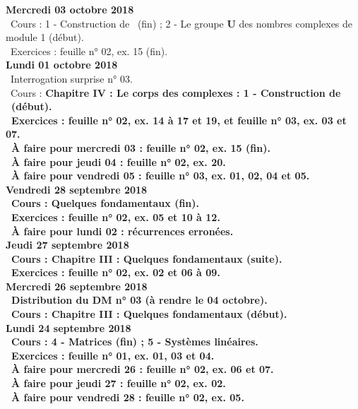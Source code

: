 \documentclass[12pt,a4paper]{article}
\begin{document}
\noindent\textbf{\bf Mercredi 03 octobre 2018}\\
\bu\ Cours : 1 - Construction de \C\ (fin) ; 2 - Le groupe \textbf{U} des nombres 
complexes de module 1 (début).\\
\bu\ Exercices : feuille n° 02, ex. 15 (fin).\vspace{.4cm}\\

\noindent\textbf{\bf Lundi 01 octobre 2018}\\
\bu\ Interrogation surprise n° 03.\\
\bu\ Cours : \bf Chapitre IV \rm : Le corps des complexes : 1 - Construction de \C\ (début).\\
\bu\ Exercices : feuille n° 02, ex. 14 à 17 et 19, et feuille n° 03, ex. 03 et 07.\\
\bu\ À faire pour mercredi 03 : feuille n° 02, ex. 15 (fin).\\
\bu\ À faire pour jeudi 04 : feuille n° 02, ex. 20.\\
\bu\ À faire pour vendredi 05 : feuille n° 03, ex. 01, 02, 04 et 05.\vspace{.4cm}\\ 

\noindent\textbf{Vendredi 28 septembre 2018}\\
\bu\ Cours : Quelques fondamentaux (fin).\\
\bu\ Exercices : feuille n° 02, ex. 05 et 10 à 12.\\
\bu\ À faire pour lundi 02 : récurrences erronées.\vspace{.4cm}\\

\noindent\textbf{Jeudi 27 septembre 2018}\\
\bu\ Cours : \bf Chapitre III \rm : Quelques fondamentaux (suite).\\
\bu\ Exercices : feuille n° 02, ex. 02 et 06 à 09.\vspace{.4cm}\\

\noindent\textbf{\bf Mercredi 26 septembre 2018}\\
\bu\ Distribution du DM n° 03 (à rendre le 04 octobre).\\
\bu\ Cours : \bf Chapitre III \rm : Quelques fondamentaux (début).\vspace{.4cm}\\

\noindent\textbf{\bf Lundi 24 septembre 2018}\\
\bu\ Cours : 4 - Matrices (fin) ; 5 - Systèmes linéaires.\\
\bu\ Exercices : feuille n° 01, ex. 01, 03 et 04.\\
\bu\ À faire pour mercredi 26 : feuille n° 02, ex. 06 et 07.\\
\bu\ À faire pour jeudi 27 : feuille n° 02, ex. 02.\\
\bu\ À faire pour vendredi 28 : feuille n° 02, ex. 05.\vspace{.4cm}\\ 
\end{document}
